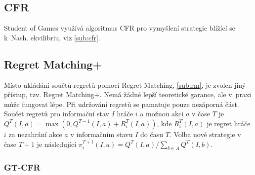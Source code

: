 \subsection{CFR}

Student of Games využívá algoritmus CFR pro vymyšlení strategie blížící se k~Nash. ekvilibriu, viz \cref{sub:cfr}.




\subsection{Regret Matching+}

Místo ukládání součtů regretů pomocí Regret Matching, \cref{sub:rm}, je zvolen jiný přístup, tzv. Regret Matching+. Nemá žádné lepší teoretické garance, ale v~praxi může fungovat lépe. Při udržování regretů se pamatuje pouze nezáporná část. Součet regretů pro informační stav $I$ hráče $i$ a možnou akci $a$ v čase $T$ je $Q^T(I, a) = \max(0, Q^{T-1}(I, a) + R_i^T(I, a))$, kde $R_i^T(I, a)$ je regret hráče $i$ za nezahrání akce $a$ v informačním stavu $I$ do času $T$. Volba nové strategie v čase $T+1$ je následující $\pi_i^{T+1}(I, a) = Q^T(I, a)/\sum_{b \in A} Q^T(I, b)$.

\subsubsection{GT-CFR}

